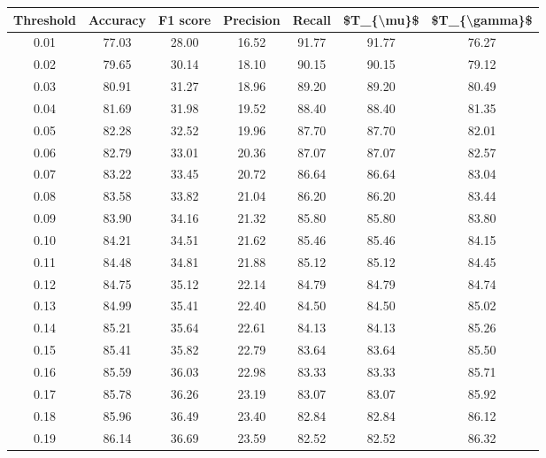 \begin{tabular}{|c|c|c|c|c|c|c|}
\hline
 Threshold &  Accuracy &  F1 score &  Precision &  Recall &  \$T\_\{\textbackslash mu\}\$ &  \$T\_\{\textbackslash gamma\}\$ \\
\hline
      0.01 &     77.03 &     28.00 &      16.52 &   91.77 &      91.77 &         76.27 \\
      0.02 &     79.65 &     30.14 &      18.10 &   90.15 &      90.15 &         79.12 \\
      0.03 &     80.91 &     31.27 &      18.96 &   89.20 &      89.20 &         80.49 \\
      0.04 &     81.69 &     31.98 &      19.52 &   88.40 &      88.40 &         81.35 \\
      0.05 &     82.28 &     32.52 &      19.96 &   87.70 &      87.70 &         82.01 \\
      0.06 &     82.79 &     33.01 &      20.36 &   87.07 &      87.07 &         82.57 \\
      0.07 &     83.22 &     33.45 &      20.72 &   86.64 &      86.64 &         83.04 \\
      0.08 &     83.58 &     33.82 &      21.04 &   86.20 &      86.20 &         83.44 \\
      0.09 &     83.90 &     34.16 &      21.32 &   85.80 &      85.80 &         83.80 \\
      0.10 &     84.21 &     34.51 &      21.62 &   85.46 &      85.46 &         84.15 \\
      0.11 &     84.48 &     34.81 &      21.88 &   85.12 &      85.12 &         84.45 \\
      0.12 &     84.75 &     35.12 &      22.14 &   84.79 &      84.79 &         84.74 \\
      0.13 &     84.99 &     35.41 &      22.40 &   84.50 &      84.50 &         85.02 \\
      0.14 &     85.21 &     35.64 &      22.61 &   84.13 &      84.13 &         85.26 \\
      0.15 &     85.41 &     35.82 &      22.79 &   83.64 &      83.64 &         85.50 \\
      0.16 &     85.59 &     36.03 &      22.98 &   83.33 &      83.33 &         85.71 \\
      0.17 &     85.78 &     36.26 &      23.19 &   83.07 &      83.07 &         85.92 \\
      0.18 &     85.96 &     36.49 &      23.40 &   82.84 &      82.84 &         86.12 \\
      0.19 &     86.14 &     36.69 &      23.59 &   82.52 &      82.52 &         86.32 \\

\end{tabular}

